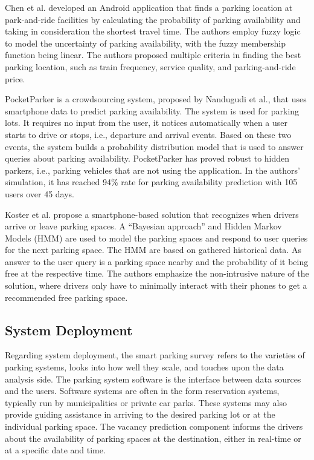 	Chen et al.\cite{zchen} developed an Android application that finds a parking location at park-and-ride facilities by calculating the probability of parking availability and taking in consideration the shortest travel time. The authors employ fuzzy logic to model the uncertainty of parking availability, with the fuzzy membership function being linear. The authors proposed multiple criteria in finding the best parking location, such as train frequency, service quality, and parking-and-ride price. 
	
	PocketParker is a crowdsourcing system, proposed by Nandugudi et al.\cite{nandugudi}, that uses smartphone data to predict parking availability. The system is used for parking lots. It requires no input from the user, it notices automatically when a user starts to drive or stops, i.e., departure and arrival events. Based on these two events, the system builds a probability distribution model that is used to answer queries about parking availability. PocketParker has proved robust to hidden parkers, i.e., parking vehicles that are not using the application. In the authors' simulation, it has reached 94\% rate for parking availability prediction with 105 users over 45 days. 
	
	Koster et al.\cite{koster} propose a smartphone-based solution that recognizes when drivers arrive or leave parking spaces. A ``Bayesian approach'' and Hidden Markov Models (HMM) are used to model the parking spaces and respond to user queries for the next parking space. The HMM are based on gathered historical data. As answer to the user query is a parking space nearby and the probability of it being free at the respective time. The authors emphasize the non-intrusive nature of the solution, where drivers only have to minimally interact with their phones to get a recommended free parking space.
	
	\subsection{System Deployment}
	Regarding system deployment, the smart parking survey refers to the varieties of parking systems, looks into how well they scale, and touches upon the data analysis side. The parking system software is the interface between data sources and the users. Software systems are often in the form reservation systems, typically run by municipalities or private car parks. These systems may also provide guiding assistance in arriving to the desired parking lot or at the individual parking space. The vacancy prediction component informs the drivers about the availability of parking spaces at the destination, either in real-time or at a specific date and time.
	
